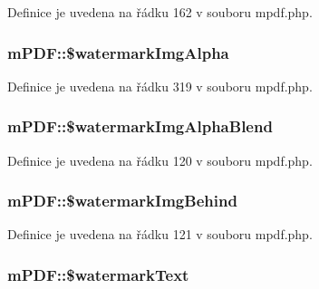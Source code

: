 Definice je uvedena na řádku 162 v souboru mpdf.\-php.

\hypertarget{classm_p_d_f_aa8a63329484ba1a8353c4d7c9bece522}{
\subsubsection[{\$watermark\-Img\-Alpha}]{\setlength{\rightskip}{0pt plus 5cm}m\-P\-D\-F\-::\$watermark\-Img\-Alpha}}\label{classm_p_d_f_aa8a63329484ba1a8353c4d7c9bece522}


Definice je uvedena na řádku 319 v souboru mpdf.\-php.

\hypertarget{classm_p_d_f_a28e0b1a0f1a02caf3a9723471e2e76bf}{
\subsubsection[{\$watermark\-Img\-Alpha\-Blend}]{\setlength{\rightskip}{0pt plus 5cm}m\-P\-D\-F\-::\$watermark\-Img\-Alpha\-Blend}}\label{classm_p_d_f_a28e0b1a0f1a02caf3a9723471e2e76bf}


Definice je uvedena na řádku 120 v souboru mpdf.\-php.

\hypertarget{classm_p_d_f_a531f8e206c4d77c4f78495cbc6f8c21a}{
\subsubsection[{\$watermark\-Img\-Behind}]{\setlength{\rightskip}{0pt plus 5cm}m\-P\-D\-F\-::\$watermark\-Img\-Behind}}\label{classm_p_d_f_a531f8e206c4d77c4f78495cbc6f8c21a}


Definice je uvedena na řádku 121 v souboru mpdf.\-php.

\hypertarget{classm_p_d_f_a8deb2383371af358077a3ae13aa5c74e}{
\subsubsection[{\$watermark\-Text}]{\setlength{\rightskip}{0pt plus 5cm}m\-P\-D\-F\-::\$watermark\-Text}}\label{classm_p_d_f_a8deb2383371af358077a3ae13aa5c74e}


